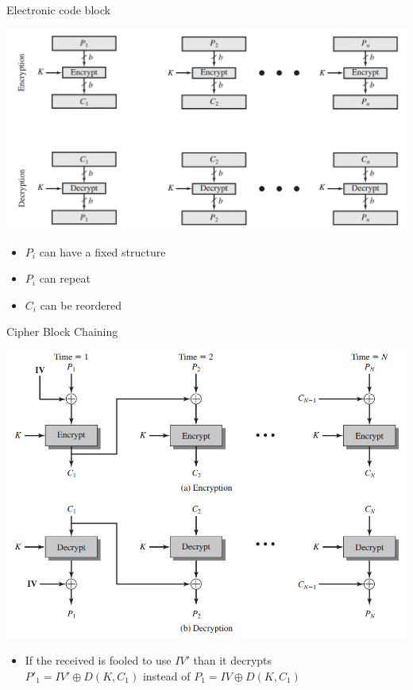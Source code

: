 \documentclass{beamer}
\begin{document}
\begin{frame}[t]{Electronic code block}
  \begin{center}
    \includegraphics[width=0.7\linewidth]{ECB}
  \end{center}
  \begin{itemize}
  \item<2-> $P_i$ can have a fixed structure
  \item <3-> $P_i$ can repeat
  \item <4-> $C_i$ can be reordered
  \end{itemize}
\end{frame}

\begin{frame}[t]{Cipher Block Chaining}
  \begin{center}
    \includegraphics[width=0.7\linewidth]{CBC}
  \end{center}
  \begin{itemize}
  \item<2-> If the received is fooled to use $IV'$ than it decrypts\\
    $P'_1 = IV' \oplus D(K,C_1)$ instead of 
    $P_1 = IV \oplus D(K,C_1)$
  \end{itemize}
\end{frame}
\end{document}
